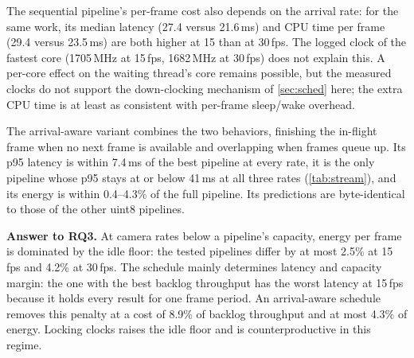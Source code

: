 The sequential pipeline's per-frame cost also depends on the arrival
rate: for the same work, its median latency (27.4 versus 21.6\,ms) and
CPU time per frame (29.4 versus 23.5\,ms) are both higher at 15 than at
30\,fps. The logged clock of the fastest core (1705\,MHz at 15\,fps,
1682\,MHz at 30\,fps) does not explain this. A per-core effect on the
waiting thread's core remains possible, but the measured clocks do not support the
down-clocking mechanism of \cref{sec:sched} here; the extra CPU time is
at least as consistent with per-frame sleep/wake overhead.

The arrival-aware variant combines the two behaviors, finishing the
in-flight frame when no next frame is available and overlapping when
frames queue up. Its p95
latency is within 7.4\,ms of the best pipeline at every rate, it is the
only pipeline whose p95 stays at or below 41\,ms at all three rates
(\cref{tab:stream}), and its energy is within 0.4--4.3\% of the full
pipeline. Its predictions are
byte-identical to those of the other uint8 pipelines.

\textbf{Answer to RQ3.}
At camera rates below a pipeline's capacity, energy per frame is
dominated by the idle floor: the tested pipelines differ by at most
2.5\% at 15\,fps and 4.2\% at 30\,fps. The schedule mainly determines
latency and capacity margin: the one with the best backlog throughput
has the worst latency at 15\,fps because it holds every
result for one frame period. An arrival-aware schedule removes this
penalty at a cost of 8.9\% of backlog throughput and at most 4.3\% of
energy. Locking clocks raises the idle floor and is counterproductive
in this regime.
